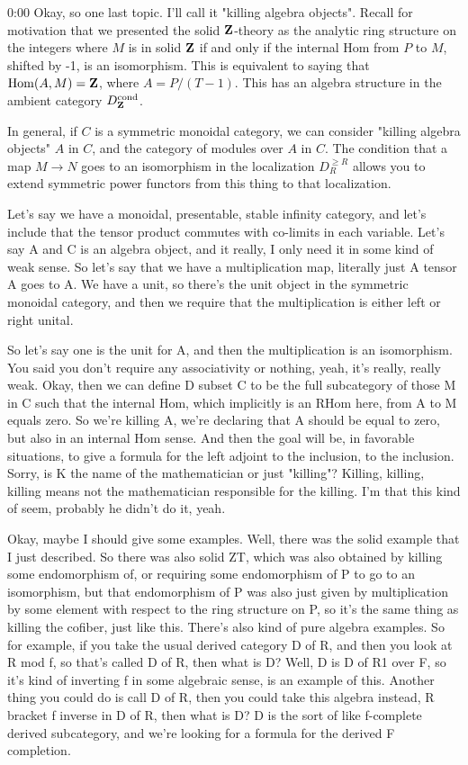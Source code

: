 \begin{unfinished}{0:00}
Okay, so one last topic. I'll call it "killing algebra objects". Recall for motivation that we presented the solid $\mathbf Z$-theory as the analytic ring structure on the integers where $M$ is in solid $\mathbf Z$ if and only if the internal Hom from $P$ to $M$, shifted by -1, is an isomorphism. This is equivalent to saying that $\mathrm{Hom}(A, M) = \mathbf Z$, where $A = P / (T-1)$. This has an algebra structure in the ambient category $D_\mathbf Z^{\mathrm{cond}}$. 

In general, if $C$ is a symmetric monoidal category, we can consider "killing algebra objects" $A$ in $C$, and the category of modules over $A$ in $C$. The condition that a map $M \to N$ goes to an isomorphism in the localization $D^{\geq R}_R$ allows you to extend symmetric power functors from this thing to that localization.

Let's say we have a monoidal, presentable, stable infinity category, and let's include that the tensor product commutes with co-limits in each variable. Let's say A and C is an algebra object, and it really, I only need it in some kind of weak sense. So let's say that we have a multiplication map, literally just A tensor A goes to A. We have a unit, so there's the unit object in the symmetric monoidal category, and then we require that the multiplication is either left or right unital.

So let's say one is the unit for A, and then the multiplication is an isomorphism. You said you don't require any associativity or nothing, yeah, it's really, really weak. Okay, then we can define D subset C to be the full subcategory of those M in C such that the internal Hom, which implicitly is an RHom here, from A to M equals zero. So we're killing A, we're declaring that A should be equal to zero, but also in an internal Hom sense. And then the goal will be, in favorable situations, to give a formula for the left adjoint to the inclusion, to the inclusion. Sorry, is K the name of the mathematician or just "killing"? Killing, killing, killing means not the mathematician responsible for the killing. I'm that this kind of seem, probably he didn't do it, yeah.

Okay, maybe I should give some examples. Well, there was the solid example that I just described. So there was also solid ZT, which was also obtained by killing some endomorphism of, or requiring some endomorphism of P to go to an isomorphism, but that endomorphism of P was also just given by multiplication by some element with respect to the ring structure on P, so it's the same thing as killing the cofiber, just like this. There's also kind of pure algebra examples. So for example, if you take the usual derived category D of R, and then you look at R mod f, so that's called D of R, then what is D? Well, D is D of R1 over F, so it's kind of inverting f in some algebraic sense, is an example of this. Another thing you could do is call D of R, then you could take this algebra instead, R bracket f inverse in D of R, then what is D? D is the sort of like f-complete derived subcategory, and we're looking for a formula for the derived F completion.


\end{unfinished}
